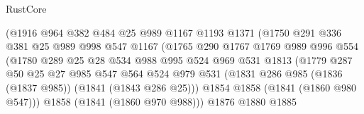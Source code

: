 \begin{lexlean}{RustCore}
\begin{coremodule}
                              (@1916
                                @964
                                @382
                                @484
                                @25
                                @989
                                @1167
                                @1193
                                @1371
                                (@1750
                                  @291
                                  @336
                                  @381
                                  @25
                                  @989
                                  @998
                                  @547
                                  @1167
                                  (@1765
                                    @290
                                    @1767
                                    @1769
                                    @989
                                    @996
                                    @554
                                    (@1780
                                      @289
                                      @25
                                      @28
                                      @534
                                      @988
                                      @995
                                      @524
                                      @969
                                      @531
                                      @1813
                                      (@1779
                                        @287
                                        @50
                                        @25
                                        @27
                                        @985
                                        @547
                                        @564
                                        @524
                                        @979
                                        @531
                                        (@1831
                                          @286
                                          @985
                                          (@1836 (@1837 @985))
                                          (@1841 (@1843 @286 @25)))
                                        @1854
                                        @1858
                                        (@1841 (@1860 @980 @547)))
                                      @1858
                                      (@1841 (@1860 @970 @988)))
                                    @1876
                                    @1880
                                    @1885

\end{coremodule}
\end{lexlean}
